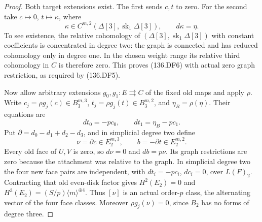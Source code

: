 \begin{proof}
Both target extensions exist.  The first sends \(c,t\)
to zero.  For the second take \(c\mapsto0\),
\(t\mapsto\kappa\), where
\[
       \kappa\in C^{m,2}(\Delta[3],\operatorname{sk}_1\Delta[3]),
                                  \qquad d\kappa=\eta.
                                                               \tag{136.DF6}
\]
To see existence, the relative cohomology of
\((\Delta[3],\operatorname{sk}_1\Delta[3])\) with
constant coefficients is concentrated in degree two: the graph
is connected and has reduced cohomology only in degree one.
In the chosen weight range its relative third cohomology in
\(C\) is therefore zero.  This proves (136.DF6) with
actual zero graph restriction, as required by (136.DF5).

Now allow arbitrary extensions \(g_0,g_1:E\rightrightarrows C\)
of the fixed old maps and apply \(\rho\).  Write
\(c_j=\rho g_j(c)\in B_3^{m,3}\),
\(t_j=\rho g_j(t)\in B_3^{m,2}\), and
\(\eta_B=\rho(\eta)\).  Their equations are
\[
                      dt_0=-pc_0,
                      \qquad dt_1=\eta_B-pc_1.
                                                               \tag{136.DF7}
\]
Put \(\partial=d_0-d_1+d_2-d_3\), and in simplicial
degree two define
\[
                   \nu=\partial c\in E_2^{m,3},
                   \qquad b=-\partial t\in E_2^{m,2}.
                                                               \tag{136.DF8}
\]
Every old face of \(U,V\) is zero, so
\(d\nu=0\) and \(db=p\nu\).  Its graph restrictions
are zero because the attachment was relative to the graph.
In simplicial degree two the four new face pairs are independent,
with \(dt_i=-pc_i\), \(dc_i=0\), over \(L(F)_2\).
Contracting that old even-disk factor gives
\(H^2(E_2)=0\) and
\(H^3(E_2)=(S/p)\langle m\rangle^{\oplus4}\).
Thus \([\nu]\) is an actual order-\(p\) class, the
alternating vector of the four face classes.
Moreover \(\rho g_j(\nu)=0\), since \(B_2\) has
no forms of degree three.


\end{proof}
